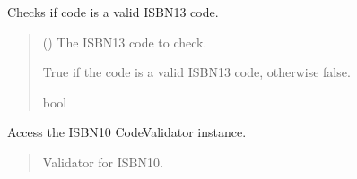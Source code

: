 \documentclass[letterpaper,10pt,english]{sphinxmanual}
\begin{document}
\begin{fulllineitems}
\begin{fulllineitems}
\label{\detokenize{apache_commons_validator_python.routines:apache_commons_validator_python.routines.isbn_validator.ISBNValidator.is_valid_isbn13}}
\pysigstartsignatures
{}
\pysigstopsignatures
\sphinxAtStartPar
Checks if code is a valid ISBN\sphinxhyphen{}13 code.
\begin{quote}\begin{description}
\sphinxAtStartPar
{} () \textendash{} The ISBN\sphinxhyphen{}13 code to check.

\sphinxAtStartPar
True if the code is a valid ISBN\sphinxhyphen{}13 code, otherwise false.

\sphinxAtStartPar
bool

\end{description}\end{quote}

\end{fulllineitems}


\begin{fulllineitems}
\label{\detokenize{apache_commons_validator_python.routines:id25}}
\pysigstartsignatures
{}
\pysigstopsignatures
\sphinxAtStartPar
Access the ISBN\sphinxhyphen{}10 CodeValidator instance.
\begin{quote}\begin{description}
\sphinxAtStartPar
Validator for ISBN\sphinxhyphen{}10.

\sphinxAtStartPar
{\hyperref[\detokenize{apache_commons_validator_python.routines:apache_commons_validator_python.routines.code_validator.CodeValidator}]{}}

\end{description}\end{quote}


\end{fulllineitems}
\end{fulllineitems}
\end{document}
